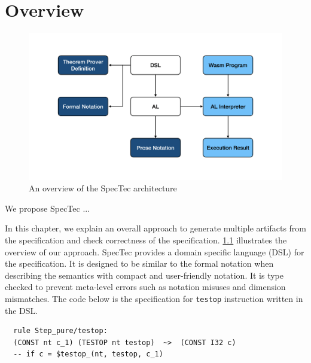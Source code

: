 
\chapter{Overview}
\label{ch:overview}
\noindent


\begin{figure}[h]
  \centerline{\includegraphics[width=15cm]{fig/overview}}
  \caption[An overview of the SpecTec architecture]
    {An overview of the SpecTec architecture}
    \label{fig:overview}
\end{figure}

We propose SpecTec ...

In this chapter, we explain an overall approach to generate multiple artifacts
from the specification and check correctness of the specification.
\cref{fig:overview} illustrates the overview of our approach.
SpecTec provides a domain specific language (DSL) for the specification.
It is designed to be similar to the formal notation when describing the
semantics with compact and user-friendly notation.
It is type checked to prevent meta-level errors such as notation misuses and
dimension mismatches.
The code below is the specification for \texttt{testop} instruction written in
the DSL.
\begin{lstlisting}
  rule Step_pure/testop:
  (CONST nt c_1) (TESTOP nt testop)  ~>  (CONST I32 c)
  -- if c = $testop_(nt, testop, c_1)
\end{lstlisting}
